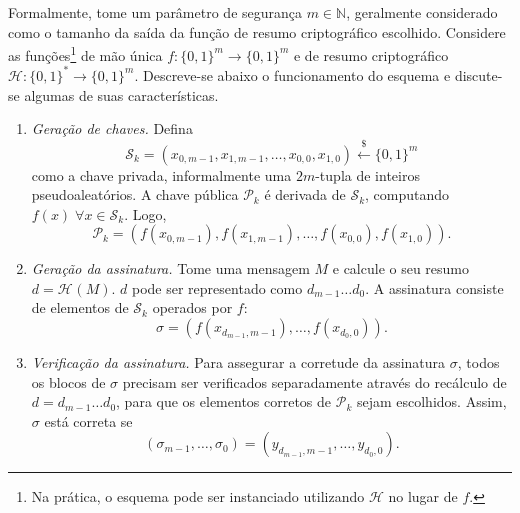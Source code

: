 \documentclass{ufsctex/ufsctex}
\newcommand{\hh}{\mathcal{H}}
\newcommand{\pk}{\mathcal{P}_k}
\newcommand{\sk}{\mathcal{S}_k}
\newcommand{\hash}[2][]{\mathcal{H}^{#1} (#2)}
\newcommand{\binwds}[1]{\{0, 1\}^{#1}}
\newcommand{\fhash}[1]{\hh{}: \binwds{*} \longrightarrow{} \binwds{#1}}
\newcommand{\random}{\stackrel{\$}{\longleftarrow}}
\begin{document}
Formalmente, tome um parâmetro de segurança $m \in \mathbb{N}$, geralmente
considerado como o tamanho da saída da função de resumo criptográfico
escolhido. Considere as funções\footnote{Na prática, o esquema pode ser
instanciado utilizando $\hh{}$ no lugar de $f$.} de mão única $f : \binwds{m}
\longrightarrow \binwds{m}$ e de resumo criptográfico $\fhash{m}$.  Descreve-se
abaixo o funcionamento do esquema e discute-se algumas de suas características.

\begin{enumerate}

  \item[] \emph{Geração de chaves.} Defina
      \begin{equation}
        \sk{} = (x_{0, m-1}, x_{1, m-1}, \dots, x_{0, 0}, x_{1, 0})
          \random{} \binwds{m}
      \end{equation}\simbolo{$\random{}$}{Seleção aleatória}
        como a chave privada, informalmente uma $2m$-tupla de inteiros
        pseudoaleatórios. A chave pública $\pk{}$ é derivada de $\sk{}$,
        computando $f(x) \; \forall x \in  \sk{}$. Logo,
        \begin{equation}
          \pk{} = (f(x_{0, m-1}), f(x_{1, m-1}), \dots, f(x_{0, 0}), f(x_{1, 0})).
        \end{equation}

  \item[] \emph{Geração da assinatura.} Tome uma mensagem $M$ e calcule o seu
      resumo $d = \hash{M}$. $d$ pode ser representado como $d_{m-1} \dots
        d_0$. A assinatura consiste de elementos de $\sk{}$ operados por $f$:
        \begin{equation}
          \sigma = (f(x_{d_{m-1}, m-1}), \dots, f(x_{d_0, 0})).
        \end{equation}

  \item[] \emph{Verificação da assinatura.} Para assegurar a corretude da
      assinatura $\sigma$, todos os blocos de $\sigma$ precisam ser verificados
        separadamente através do recálculo de $d = d_{m-1} \dots d_0$, para que
        os elementos corretos de $\pk{}$ sejam escolhidos.  Assim, $\sigma$
        está correta se
        \begin{equation}
          (\sigma_{m-1}, \dots, \sigma_0)
            = (y_{d_{m-1}, m-1}, \dots, y_{d_{0}, 0}).
        \end{equation}

\end{enumerate}
\end{document}
